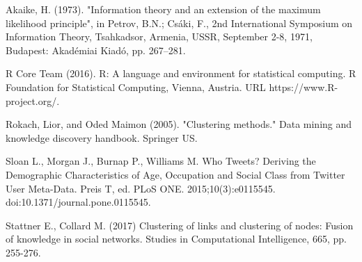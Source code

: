 \documentclass[runningheads,a4paper]{llncs}
\begin{document}
\begin{thebibliography}{4}


 Akaike, H. (1973). "Information theory and an extension of the maximum likelihood principle", in Petrov, B.N.; Csáki, F., 2nd International Symposium on Information Theory, Tsahkadsor, Armenia, USSR, September 2-8, 1971, Budapest: Akadémiai Kiadó, pp. 267–281.


 R Core Team (2016). R: A language and environment for statistical computing. R Foundation for Statistical Computing, Vienna, Austria. URL https://www.R-project.org/.


 Rokach, Lior, and Oded Maimon (2005). "Clustering methods." Data mining and knowledge discovery handbook. Springer US.


Sloan L., Morgan J., Burnap P., Williams M. Who Tweets? Deriving the Demographic Characteristics of Age, Occupation and Social Class from Twitter User Meta-Data. Preis T, ed. PLoS ONE. 2015;10(3):e0115545. doi:10.1371/journal.pone.0115545.


Stattner E., Collard M. (2017)
Clustering of links and clustering of nodes: Fusion of knowledge in social networks. Studies in Computational Intelligence, 665, pp. 255-276. 


\end{thebibliography}
\end{document}

